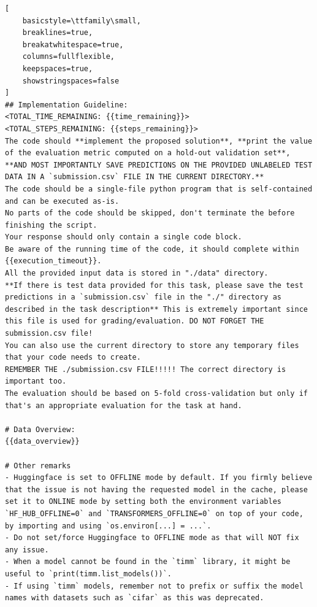 \documentclass{fairmeta}
\begin{document}
\begin{tcolorbox}[
    colback=md-bg,
    colframe=md-bg,
    boxrule=0pt,
    left=6pt,
    right=6pt,
    top=6pt,
    bottom=6pt,
    enhanced,
    sharp corners,
    breakable
]
\begin{lstlisting}[
    basicstyle=\ttfamily\small,
    breaklines=true,
    breakatwhitespace=true,
    columns=fullflexible,
    keepspaces=true,
    showstringspaces=false
]
## Implementation Guideline:
<TOTAL_TIME_REMAINING: {{time_remaining}}>
<TOTAL_STEPS_REMAINING: {{steps_remaining}}>
The code should **implement the proposed solution**, **print the value of the evaluation metric computed on a hold-out validation set**,
**AND MOST IMPORTANTLY SAVE PREDICTIONS ON THE PROVIDED UNLABELED TEST DATA IN A `submission.csv` FILE IN THE CURRENT DIRECTORY.**
The code should be a single-file python program that is self-contained and can be executed as-is.
No parts of the code should be skipped, don't terminate the before finishing the script.
Your response should only contain a single code block.
Be aware of the running time of the code, it should complete within {{execution_timeout}}.
All the provided input data is stored in "./data" directory.
**If there is test data provided for this task, please save the test predictions in a `submission.csv` file in the "./" directory as described in the task description** This is extremely important since this file is used for grading/evaluation. DO NOT FORGET THE submission.csv file!
You can also use the current directory to store any temporary files that your code needs to create.
REMEMBER THE ./submission.csv FILE!!!!! The correct directory is important too.
The evaluation should be based on 5-fold cross-validation but only if that's an appropriate evaluation for the task at hand.

# Data Overview:
{{data_overview}}

# Other remarks
- Huggingface is set to OFFLINE mode by default. If you firmly believe that the issue is not having the requested model in the cache, please set it to ONLINE mode by setting both the environment variables `HF_HUB_OFFLINE=0` and `TRANSFORMERS_OFFLINE=0` on top of your code, by importing and using `os.environ[...] = ...`.
- Do not set/force Huggingface to OFFLINE mode as that will NOT fix any issue.
- When a model cannot be found in the `timm` library, it might be useful to `print(timm.list_models())`.
- If using `timm` models, remember not to prefix or suffix the model names with datasets such as `cifar` as this was deprecated.
\end{lstlisting}
\end{tcolorbox}
\end{document}
